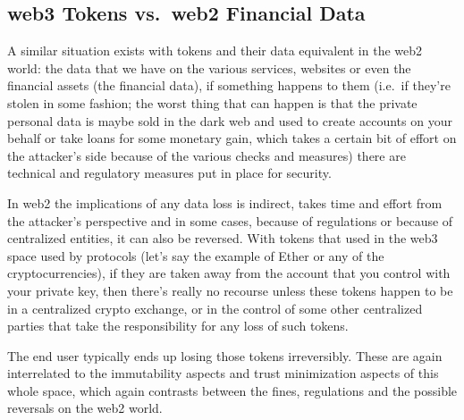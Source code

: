 \subsection{web3 Tokens vs.~web2 Financial
Data}\label{web3-tokens-vs.-web2-financial-data}

A similar situation exists with tokens and their data equivalent in the
web2 world: the data that we have on the various services, websites or
even the financial assets (the financial data), if something happens to
them (i.e.~if they're stolen in some fashion; the worst thing that can
happen is that the private personal data is maybe sold in the dark web
and used to create accounts on your behalf or take loans for some
monetary gain, which takes a certain bit of effort on the attacker's
side because of the various checks and measures) there are technical and
regulatory measures put in place for security.

In web2 the implications of any data loss is indirect, takes time and
effort from the attacker's perspective and in some cases, because of
regulations or because of centralized entities, it can also be reversed.
With tokens that used in the web3 space used by protocols (let's say the
example of Ether or any of the cryptocurrencies), if they are taken away
from the account that you control with your private key, then there's
really no recourse unless these tokens happen to be in a centralized
crypto exchange, or in the control of some other centralized parties
that take the responsibility for any loss of such tokens.

The end user typically ends up losing those tokens irreversibly. These
are again interrelated to the immutability aspects and trust
minimization aspects of this whole space, which again contrasts between
the fines, regulations and the possible reversals on the web2 world.

